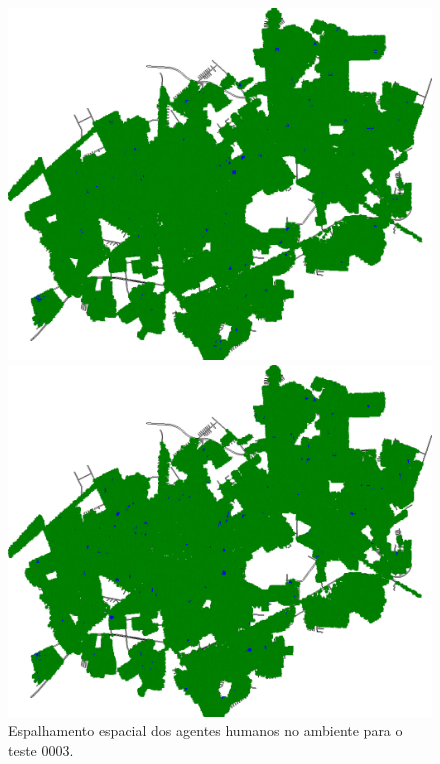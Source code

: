 \begin{figure}[H]
\begin{minipage}{.5\textwidth}
    \captionsetup{labelformat=empty}
  \end{minipage}
  \begin{minipage}{.5\textwidth}
    \centering
    \includegraphics[width=1.0\textwidth]{Figuras/Resultados/0003/Saidas/MonteCarlo_0/Simulacao_0/Espacial/00160.png}
    \captionsetup{labelformat=empty}
  \end{minipage}%
  \begin{minipage}{.5\textwidth}
    \centering
    \includegraphics[width=1.0\textwidth]{Figuras/Resultados/0003/Saidas/MonteCarlo_0/Simulacao_0/Espacial/00200.png}
    \captionsetup{labelformat=empty}
  \end{minipage}
  \caption{Espalhamento espacial dos agentes humanos no ambiente para o teste 0003.}
  \label{fig:casos_0003}
\end{figure}

